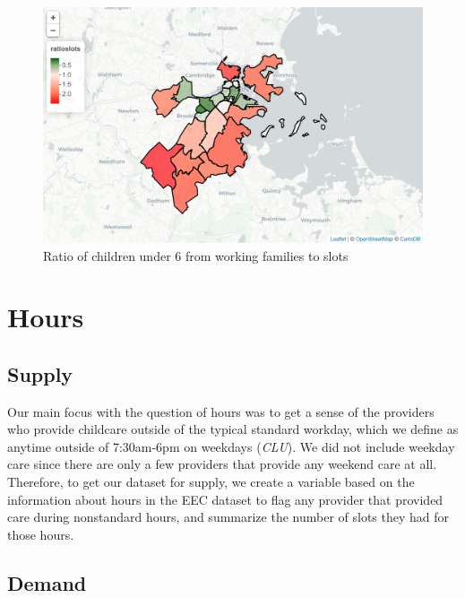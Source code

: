 \documentclass[10pt,letterpaper]{article}
\begin{document}
\begin{figure}

{\centering \includegraphics[width=1\linewidth]{fig3} 

}

\caption{Ratio of children under 6 from working families to slots}\label{fig:unnamed-chunk-6}
\end{figure}

\section{Hours}\label{hours}

\subsection{Supply}\label{supply-1}

Our main focus with the question of hours was to get a sense of the
providers who provide childcare outside of the typical standard workday,
which we define as anytime outside of 7:30am-6pm on weekdays
(\emph{CLU}). We did not include weekday care since there are only a few
providers that provide any weekend care at all. Therefore, to get our
dataset for supply, we create a variable based on the information about
hours in the EEC dataset to flag any provider that provided care during
nonstandard hours, and summarize the number of slots they had for those
hours.

\subsection{Demand}\label{demand-1}
\end{document}
